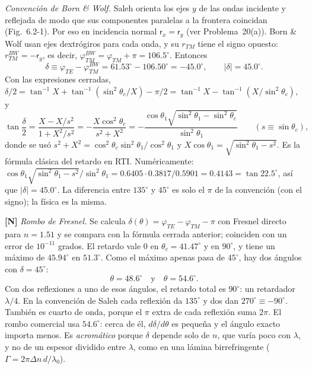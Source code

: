 \emph{Convención de Born \& Wolf.} Saleh orienta los ejes $y$ de las ondas incidente y reflejada
de modo que sus componentes paralelas a la frontera coincidan (Fig.~6.2-1). Por eso en incidencia
normal $\mathsf r_x=\mathsf r_y$ (ver Problema~20(a)). Born \& Wolf usan ejes dextrógiros para cada
onda, y su $r_{TM}$ tiene el signo opuesto: $r_{TM}^{BW}=-\mathsf r_y$, es decir,
$\varphi_{TM}^{BW}=\varphi_{TM}+\pi=106.5^\circ$. Entonces
\[
\delta\equiv\varphi_{TE}-\varphi_{TM}^{BW}=61.53^\circ-106.50^\circ=-45.0^\circ,\qquad |\delta|=45.0^\circ .
\]
Con las expresiones cerradas, $\delta/2=\tan^{-1}X+\tan^{-1}(\sin^2\theta_c/X)-\pi/2=\tan^{-1}X-\tan^{-1}(X/\sin^2\theta_c)$, y
\[
\tan\frac{\delta}{2}=\frac{X-X/s^2}{1+X^2/s^2}=-\frac{X\cos^2\theta_c}{s^2+X^2}
=-\frac{\cos\theta_1\sqrt{\sin^2\theta_1-\sin^2\theta_c}}{\sin^2\theta_1}\qquad(s\equiv\sin\theta_c),
\]
donde se usó $s^2+X^2=\cos^2\theta_c\sin^2\theta_1/\cos^2\theta_1$ y $X\cos\theta_1=\sqrt{\sin^2\theta_1-s^2}$.
Es la fórmula clásica del retardo en RTI. Numéricamente:
$\cos\theta_1\sqrt{\sin^2\theta_1-s^2}/\sin^2\theta_1=0.6405\cdot0.3817/0.5901=0.4143=\tan22.5^\circ$, así que $|\delta|=45.0^\circ$.
La diferencia entre $135^\circ$ y $45^\circ$ es solo el $\pi$ de la convención (con el signo); la física es la misma.

 \textbf{[N]} \emph{Rombo de Fresnel.} Se calcula $\delta(\theta)=\varphi_{TE}-\varphi_{TM}-\pi$ con Fresnel
directo para $n=1.51$ y se compara con la fórmula cerrada anterior; coinciden con un error de $10^{-11}$
grados. El retardo vale 0 en $\theta_c=41.47^\circ$ y en $90^\circ$, y tiene un máximo de
$45.94^\circ$ en $51.3^\circ$. Como el máximo apenas pasa de $45^\circ$, hay dos ángulos con
$\delta=45^\circ$:
\[
\theta=48.6^\circ\quad\text{y}\quad\theta=54.6^\circ .
\]
Con dos reflexiones a uno de esos ángulos, el retardo total es $90^\circ$: un retardador $\lambda/4$. En la
convención de Saleh cada reflexión da $135^\circ$ y dos dan $270^\circ\equiv-90^\circ$. También es
cuarto de onda, porque el $\pi$ extra de cada reflexión suma $2\pi$. El rombo comercial usa $54.6^\circ$:
cerca de él, $d\delta/d\theta$ es pequeña y el ángulo exacto importa menos. Es \emph{acromático}
porque $\delta$ depende solo de $n$, que varía poco con $\lambda$, y no de un espesor dividido entre
$\lambda$, como en una lámina birrefringente ($\Gamma=2\pi\Delta n\,d/\lambda_0$).

